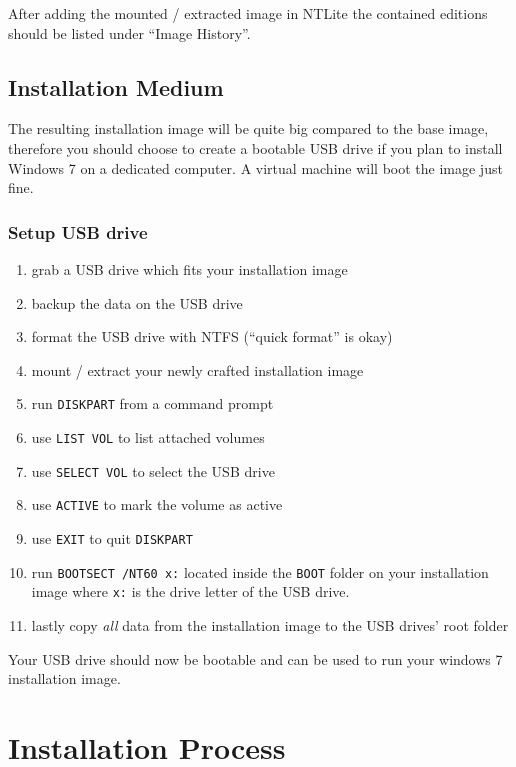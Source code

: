 \documentclass{itsarticle}
\begin{document}
After adding the mounted / extracted image in NTLite the contained editions
should be listed under ``Image History''.

\subsection{Installation Medium}
\label{sub:medium}

The resulting installation image will be quite big compared to the base image,
therefore you should choose to create a bootable USB drive if you plan to
install Windows 7 on a dedicated computer. A virtual machine will boot the
image just fine.

\subsubsection{Setup USB drive}

\begin{enumerate}
    \item grab a USB drive which fits your installation image
    \item backup the data on the USB drive
    \item format the USB drive with NTFS (``quick format'' is okay)
    \item mount / extract your newly crafted installation image
    \item run \texttt{DISKPART} from a command prompt
    \item use \texttt{LIST VOL} to list attached volumes
    \item use \texttt{SELECT VOL} to select the USB drive
    \item use \texttt{ACTIVE} to mark the volume as active
    \item use \texttt{EXIT} to quit \texttt{DISKPART}
    \item run \texttt{BOOTSECT /NT60 x:} located inside the \texttt{BOOT}
        folder on your installation image where \texttt{x:} is the drive letter
        of the USB drive.
    \item lastly copy \emph{all} data from the installation image to the USB
        drives' root folder
\end{enumerate}

Your USB drive should now be bootable and can be used to run your windows 7
installation image.

\section{Installation Process}
\label{sec:installation}
\end{document}
